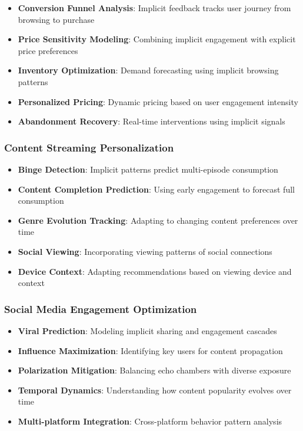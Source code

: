 \begin{itemize}
    \item \textbf{Conversion Funnel Analysis}: Implicit feedback tracks user journey from browsing to purchase
    \item \textbf{Price Sensitivity Modeling}: Combining implicit engagement with explicit price preferences
    \item \textbf{Inventory Optimization}: Demand forecasting using implicit browsing patterns
    \item \textbf{Personalized Pricing}: Dynamic pricing based on user engagement intensity
    \item \textbf{Abandonment Recovery}: Real-time interventions using implicit signals
\end{itemize}

\subsubsection{Content Streaming Personalization}

\begin{itemize}
    \item \textbf{Binge Detection}: Implicit patterns predict multi-episode consumption
    \item \textbf{Content Completion Prediction}: Using early engagement to forecast full consumption
    \item \textbf{Genre Evolution Tracking}: Adapting to changing content preferences over time
    \item \textbf{Social Viewing}: Incorporating viewing patterns of social connections
    \item \textbf{Device Context}: Adapting recommendations based on viewing device and context
\end{itemize}

\subsubsection{Social Media Engagement Optimization}

\begin{itemize}
    \item \textbf{Viral Prediction}: Modeling implicit sharing and engagement cascades
    \item \textbf{Influence Maximization}: Identifying key users for content propagation
    \item \textbf{Polarization Mitigation}: Balancing echo chambers with diverse exposure
    \item \textbf{Temporal Dynamics}: Understanding how content popularity evolves over time
    \item \textbf{Multi-platform Integration}: Cross-platform behavior pattern analysis
\end{itemize}

